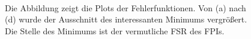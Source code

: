 \begin{figure}[H]
{{{		}\\
	}}
	\caption[FSR-Bestimmung]{Die Abbildung zeigt die Plots der Fehlerfunktionen.
	Von (a) nach (d) wurde der Ausschnitt des interessanten Minimums vergrößert. Die
	Stelle des Minimums ist der vermutliche FSR des FPIs.}
	\label{fig:nonius_FSR_messung}
\end{figure}


